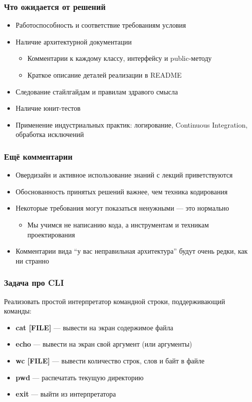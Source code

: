 \documentclass[xetex,mathserif,serif]{beamer}
\begin{document}
	\begin{frame}
		\frametitle{Что ожидается от решений}
		\begin{itemize}
			\item Работоспособность и соответствие требованиям условия
			\item Наличие архитектурной документации
			\begin{itemize}
				\item Комментарии к каждому классу, интерфейсу и public-методу
				\item Краткое описание деталей реализации в README
			\end{itemize}
			\item Следование стайлгайдам и правилам здравого смысла 
			\item Наличие юнит-тестов
			\item Применение индустриальных практик: логирование, Continuous Integration, обработка исключений
		\end{itemize}
	\end{frame}

	\begin{frame}
		\frametitle{Ещё комментарии}
		\begin{itemize}
			\item Овердизайн и активное использование знаний с лекций приветствуются
			\item Обоснованность принятых решений важнее, чем техника кодирования
			\item Некоторые требования могут показаться ненужными --- это нормально
			\begin{itemize}
				\item Мы учимся не написанию кода, а инструментам и техникам проектирования
			\end{itemize}
			\item Комментарии вида ``у вас неправильная архитектура'' будут очень редки, как ни странно
		\end{itemize}
	\end{frame}
	
	\begin{frame}
		\frametitle{Задача про CLI}
		Реализовать простой интерпретатор командной строки, поддерживающий команды:
		\begin{itemize}
			\item \textbf{cat [FILE]} --- вывести на экран содержимое файла
			\item \textbf{echo} --- вывести на экран свой аргумент (или аргументы)
			\item \textbf{wc [FILE]} --- вывести количество строк, слов и байт в файле
			\item \textbf{pwd} --- распечатать текущую директорию
			\item \textbf{exit} --- выйти из интерпретатора
		\end{itemize}
	\end{frame}
	
\end{document}
